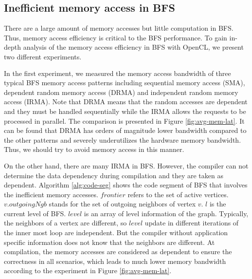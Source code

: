 %

\subsection{Inefficient memory access in BFS}
There are a large amount of memory accesses but little computation in BFS. 
Thus, memory access efficiency is critical to the BFS performance. To gain in-depth 
analysis of the memory access efficiency in BFS with OpenCL, we present two different 
experiments.

In the first experiment, we measured the memory access bandwidth 
of three typical BFS memory access patterns including sequential memory access (SMA), 
dependent random memory access (DRMA) and independent random memory access (IRMA).
Note that DRMA means that the random accesses 
are dependent and they must be handled sequentially while the IRMA 
allows the requests to be processed in parallel. The 
comparison is presented in Figure \ref{fig:avg-mem-lat}. 
It can be found that DRMA has orders of magnitude 
lower bandwidth compared to the other patterns and severely 
underutilizes the hardware memory bandwidth. Thus, we should try 
to avoid memory access in this manner. 

On the other hand, there are many IRMA in BFS.  
However, the compiler can not determine the data dependency during 
compilation and they are taken as dependent. Algorithm \ref{alg:code-seg} 
shows the code segment of BFS that involves the inefficient 
memory accesses. $frontier$ refers to the set of active vertices. 
$v.outgoingNgb$ stands for the set of outgoing neighbors of 
vertex $v$. $l$ is the current level of BFS. $level$ is an 
array of level information of the graph. Typically, the neighbors 
of a vertex are different, so $level$ update in different iterations 
of the inner most loop are independent. But the compiler without 
application specific information does not know that the neighbors 
are different. At compilation, the memory accesses are considered 
as dependent to ensure the correctness in all scenarios, 
which leads to much lower memory bandwidth according to the 
experiment in Figure \ref{fig:avg-mem-lat}.

